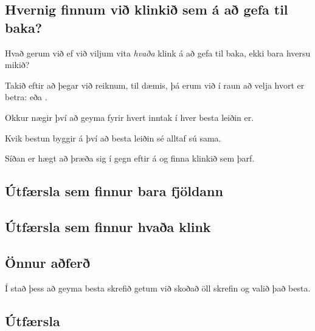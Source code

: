\subsection{Hvernig finnum við klinkið sem á að gefa til baka?}
{
    {
        \item<1-> Hvað gerum við ef við viljum vita \emph{hvaða} klink á að gefa til baka, ekki bara hversu mikið?
        \item<2-> Takið eftir að þegar við reiknum, til dæmis, 
                    þá erum við í raun að velja hvort er betra:  eða .
        \item<3-> Okkur nægir því að geyma fyrir hvert inntak í  hver besta leiðin er.
        \item<4-> Kvik bestun byggir á því að besta leiðin sé alltaf sú sama.
        \item<5-> Síðan er hægt að þræða sig í gegn eftir á og finna klinkið sem þarf.
    }
}

\subsection{Útfærsla sem finnur bara fjöldann}
{
}

\subsection{Útfærsla sem finnur hvaða klink}
{
}

\subsection{Önnur aðferð}
{
    {
        \item<1-> Í stað þess að geyma besta skrefið getum við skoðað öll skrefin og valið það besta.
    }
}

\subsection{Útfærsla}
{
}

